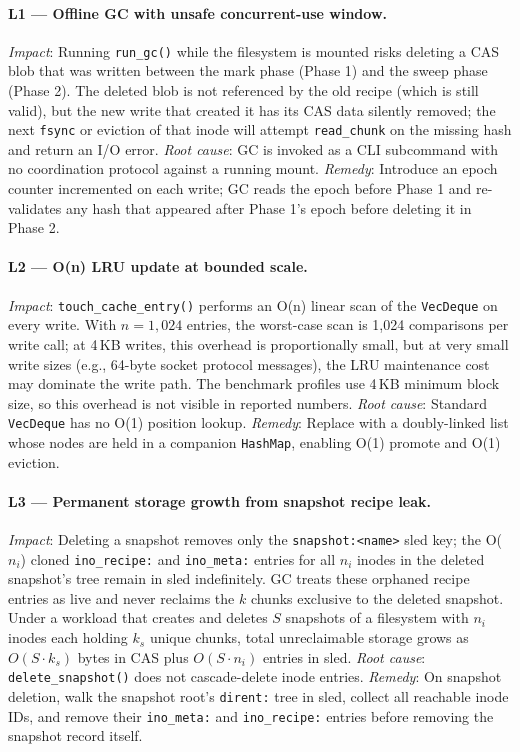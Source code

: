 \documentclass[journal]{IEEEtran}
\begin{document}
\paragraph{L1 — Offline GC with unsafe concurrent-use window.}
\textit{Impact}: Running \texttt{run\_gc()} while the filesystem is
mounted risks deleting a CAS blob that was written between the mark phase
(Phase 1) and the sweep phase (Phase 2).  The deleted blob is not
referenced by the old recipe (which is still valid), but the new write
that created it has its CAS data silently removed; the next
\texttt{fsync} or eviction of that inode will attempt \texttt{read\_chunk}
on the missing hash and return an I/O error.  \textit{Root cause}: GC
is invoked as a CLI subcommand with no coordination protocol against
a running mount. \textit{Remedy}: Introduce an epoch counter incremented
on each write; GC reads the epoch before Phase 1 and re-validates any
hash that appeared after Phase 1's epoch before deleting it in Phase 2.

\paragraph{L2 — O(n) LRU update at bounded scale.}
\textit{Impact}: \texttt{touch\_cache\_entry()} performs an O(n) linear
scan of the \texttt{VecDeque} on every write.  With $n = 1{,}024$ entries,
the worst-case scan is 1,024 comparisons per write call; at 4\,KB writes,
this overhead is proportionally small, but at very small write sizes
(e.g., 64-byte socket protocol messages), the LRU maintenance cost
may dominate the write path.  The benchmark profiles use 4\,KB minimum
block size, so this overhead is not visible in reported numbers.
\textit{Root cause}: Standard \texttt{VecDeque} has no O(1) position
lookup. \textit{Remedy}: Replace with a doubly-linked list whose nodes
are held in a companion \texttt{HashMap}, enabling O(1) promote and
O(1) eviction.

\paragraph{L3 — Permanent storage growth from snapshot recipe leak.}
\textit{Impact}: Deleting a snapshot removes only the
\texttt{snapshot:\textless{}name\textgreater{}} sled key; the O($n_i$)
cloned \texttt{ino\_recipe:} and \texttt{ino\_meta:} entries for all
$n_i$ inodes in the deleted snapshot's tree remain in sled
indefinitely.  GC treats these orphaned recipe entries as live and
never reclaims the $k$ chunks exclusive to the deleted snapshot.  Under
a workload that creates and deletes $S$ snapshots of a filesystem with
$n_i$ inodes each holding $k_s$ unique chunks, total unreclaimable
storage grows as $O(S \cdot k_s)$ bytes in CAS plus $O(S \cdot n_i)$
entries in sled.  \textit{Root cause}: \texttt{delete\_snapshot()} does
not cascade-delete inode entries.  \textit{Remedy}: On snapshot deletion,
walk the snapshot root's \texttt{dirent:} tree in sled, collect all
reachable inode IDs, and remove their \texttt{ino\_meta:} and
\texttt{ino\_recipe:} entries before removing the snapshot record itself.
\end{document}
